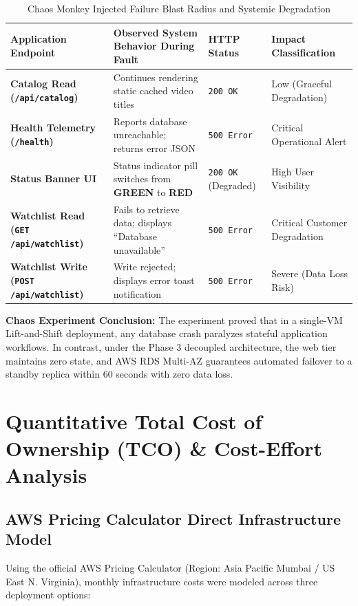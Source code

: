 \documentclass[11pt,a4paper]{article}
\begin{document}
\begin{table}[htbp]
\centering
\small
\caption{Chaos Monkey Injected Failure Blast Radius and Systemic Degradation}
\label{tab:chaos_matrix}
\begin{tabularx}{\textwidth}{p{4.2cm}X p{2.2cm}p{2.8cm}}
\toprule
\textbf{Application Endpoint} & \textbf{Observed System Behavior During Fault} & \textbf{HTTP Status} & \textbf{Impact Classification} \\
\midrule
\textbf{Catalog Read (\texttt{/api/catalog})} & Continues rendering static cached video titles & \texttt{200 OK} & Low (Graceful Degradation) \\
\textbf{Health Telemetry (\texttt{/health})} & Reports database unreachable; returns error JSON & \texttt{500 Error} & Critical Operational Alert \\
\textbf{Status Banner UI} & Status indicator pill switches from \textbf{GREEN} to \textbf{RED} & \texttt{200 OK} (Degraded) & High User Visibility \\
\textbf{Watchlist Read (\texttt{GET /api/watchlist})} & Fails to retrieve data; displays ``Database unavailable'' & \texttt{500 Error} & Critical Customer Degradation \\
\textbf{Watchlist Write (\texttt{POST /api/watchlist})} & Write rejected; displays error toast notification & \texttt{500 Error} & Severe (Data Loss Risk) \\
\bottomrule
\end{tabularx}
\end{table}

\textbf{Chaos Experiment Conclusion:} The experiment proved that in a single-VM Lift-and-Shift deployment, any database crash paralyzes stateful application workflows. In contrast, under the Phase 3 decoupled architecture, the web tier maintains zero state, and AWS RDS Multi-AZ guarantees automated failover to a standby replica within 60 seconds with zero data loss.

\newpage

\section{Quantitative Total Cost of Ownership (TCO) \& Cost-Effort Analysis}

\subsection{AWS Pricing Calculator Direct Infrastructure Model}
Using the official AWS Pricing Calculator (Region: Asia Pacific Mumbai / US East N. Virginia), monthly infrastructure costs were modeled across three deployment options:
\end{document}

